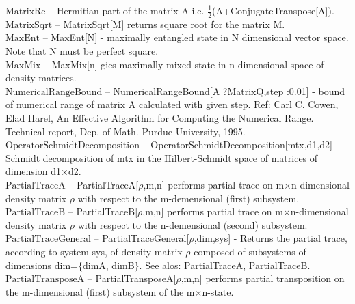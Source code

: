 \documentclass[a4paper,10pt]{scrartcl}
\begin{document}
\textbf{$ \text{MatrixRe} $ }-- Hermitian part of the matrix A i.e. $ \frac{1}{2} $(A+ConjugateTranspose[A]).$  $\\

\textbf{$ \text{MatrixSqrt} $ }-- MatrixSqrt[M] returns square root for the matrix M.$  $\\

\textbf{$ \text{MaxEnt} $ }-- MaxEnt[N] - maximally entangled state in N dimensional vector space. Note that N must be perfect square.$  $\\

\textbf{$ \text{MaxMix} $ }-- MaxMix[n] gies maximally mixed state in n-dimensional space of density matrices.$  $\\

\textbf{$ \text{NumericalRangeBound} $ }-- NumericalRangeBound[A$\_$?MatrixQ,step$\_$:0.01] - bound of numerical range of matrix A calculated with given step. Ref: Carl C. Cowen, Elad Harel, An Effective Algorithm for Computing the Numerical Range. Technical report, Dep. of Math. Purdue University, 1995.$  $\\

\textbf{$ \text{OperatorSchmidtDecomposition} $ }-- OperatorSchmidtDecomposition[mtx,d1,d2] - Schmidt decomposition of mtx in the Hilbert-Schmidt space of matrices of dimension d1$\times $d2.$  $\\

\textbf{$ \text{PartialTraceA} $ }-- PartialTraceA[$\rho $,m,n] performs partial trace on m$\times $n-dimensional density matrix $\rho $ with respect to the m-demensional (first) subsystem.$  $\\

\textbf{$ \text{PartialTraceB} $ }-- PartialTraceB[$\rho $,m,n] performs partial trace on m$\times $n-dimensional density matrix $\rho $ with respect to the n-demensional (second) subsystem.$  $\\

\textbf{$ \text{PartialTraceGeneral} $ }-- PartialTraceGeneral[$\rho $,dim,sys] - Returns the partial trace, according to system sys, of density matrix $\rho $ composed of subsystems of dimensions dim=$\{$dimA, dimB$\}$. See alos: PartialTraceA, PartialTraceB.$  $\\

\textbf{$ \text{PartialTransposeA} $ }-- PartialTransposeA[$\rho $,m,n] performs partial transposition on the m-dimensional (first) subsystem of the m$\times $n-state.$  $\\
\end{document}
